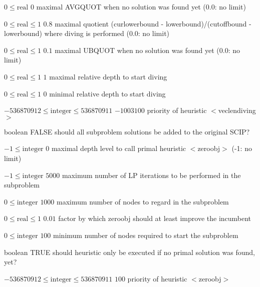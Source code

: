 %
{$0\leq\textrm{real}$}%
{$0$}%
{maximal AVGQUOT when no solution was found yet (0.0: no limit)}%
{}

%
{$0\leq\textrm{real}\leq1$}%
{$0.8$}%
{maximal quotient (curlowerbound - lowerbound)/(cutoffbound - lowerbound) where diving is performed (0.0: no limit)}%
{}

%
{$0\leq\textrm{real}\leq1$}%
{$0.1$}%
{maximal UBQUOT when no solution was found yet (0.0: no limit)}%
{}

%
{$0\leq\textrm{real}\leq1$}%
{$1$}%
{maximal relative depth to start diving}%
{}

%
{$0\leq\textrm{real}\leq1$}%
{$0$}%
{minimal relative depth to start diving}%
{}

%
{$-536870912\leq\textrm{integer}\leq536870911$}%
{$-1003100$}%
{priority of heuristic $<$veclendiving$>$}%
{}

%
{boolean}%
{FALSE}%
{should all subproblem solutions be added to the original SCIP?}%
{}

%
{$-1\leq\textrm{integer}$}%
{$0$}%
{maximal depth level to call primal heuristic $<$zeroobj$>$ (-1: no limit)}%
{}

%
{$-1\leq\textrm{integer}$}%
{$5000$}%
{maximum number of LP iterations to be performed in the subproblem}%
{}

%
{$0\leq\textrm{integer}$}%
{$1000$}%
{maximum number of nodes to regard in the subproblem}%
{}

%
{$0\leq\textrm{real}\leq1$}%
{$0.01$}%
{factor by which zeroobj should at least improve the incumbent}%
{}

%
{$0\leq\textrm{integer}$}%
{$100$}%
{minimum number of nodes required to start the subproblem}%
{}

%
{boolean}%
{TRUE}%
{should heuristic only be executed if no primal solution was found, yet?}%
{}

%
{$-536870912\leq\textrm{integer}\leq536870911$}%
{$100$}%
{priority of heuristic $<$zeroobj$>$}%
{}

